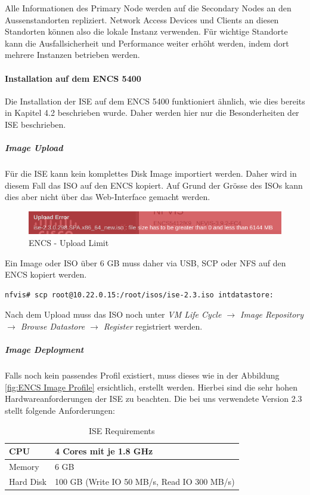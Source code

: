 Alle Informationen des Primary Node werden auf die Secondary Nodes an den Aussenstandorten repliziert. Network Access Devices und Clients an diesen Standorten können also die lokale Instanz verwenden.  Für wichtige Standorte kann die Ausfallsicherheit und Performance weiter erhöht werden, indem dort mehrere Instanzen betrieben werden.

\paragraph{Installation auf dem ENCS 5400}

Die Installation der ISE auf dem ENCS 5400 funktioniert ähnlich, wie dies bereits in Kapitel 4.2 beschrieben wurde. Daher werden hier nur die Besonderheiten der ISE beschrieben.

\subparagraph{Image Upload}
Für die ISE kann kein komplettes Disk Image importiert werden. Daher wird in diesem Fall das ISO auf den ENCS kopiert. Auf Grund der Grösse des ISOs kann dies aber nicht über das Web-Interface gemacht werden.

\begin{figure}[H]
	\centering
	\includegraphics[width=0.8\linewidth]{img/Absicherung/ENCS-Upload-Limit.png}
	\caption{ENCS - Upload Limit}
	\label{fig:ENCS - Upload Limit}
\end{figure}

Ein Image oder ISO über 6 GB muss daher via USB, SCP oder NFS auf den ENCS kopiert werden. 

\begin{lstlisting}[language=bash]
nfvis# scp root@10.22.0.15:/root/isos/ise-2.3.iso intdatastore:
\end{lstlisting}

Nach dem Upload muss das ISO noch unter \textit{VM Life Cycle $\rightarrow$ Image Repository $\rightarrow$ Browse Datastore $\rightarrow$ Register} registriert werden.

\subparagraph{Image Deployment}

Falls noch kein passendes Profil existiert, muss dieses wie in der Abbildung \ref{fig:ENCS Image Profile} ersichtlich, erstellt werden. Hierbei sind die sehr hohen Hardwareanforderungen der ISE zu beachten. Die bei uns verwendete Version 2.3 stellt folgende Anforderungen:

\begin{table}[H]
	\centering
	\begin{tabularx}{\textwidth}{l | X}
		CPU & 4 Cores mit je 1.8 GHz        \\
		\hline
		Memory & 6 GB \\
		\hline
		Hard Disk & 100 GB (Write IO 50 MB/s, Read IO 300 MB/s) \\
	\end{tabularx}
	\caption{ISE Requirements}
	\label{tab:ISE Requirements}
\end{table}

